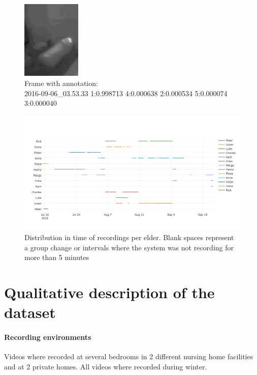 \documentclass[oneside, twocolumn]{article}
\begin{document}
\begin{figure}
  \centering
    \includegraphics[width=0.25\textwidth]{images/image_with_annotation.png}
  \caption{Frame with annotation: \\2016-09-06\_03.53.33 1:0.998713 4:0.000638 2:0.000534 5:0.000074 3:0.000040}
  \label{fig:image_w_annotation}
\end{figure}

\begin{figure}
  \centering
    \includegraphics[width=1.0\textwidth]{images/recording_timeline}
  \caption{Distribution in time of recordings per elder. Blank spaces represent a group change or intervals where the system was not recording for more than 5 minutes}
  \label{fig:timeline}
\end{figure}


\section{Qualitative description of the dataset}
\label{sec:properties}
\paragraph{Recording environments}
Videos where recorded at several bedrooms in 2 different nursing home facilities and at 2 private homes. All videos
where recorded during winter.
\end{document}
